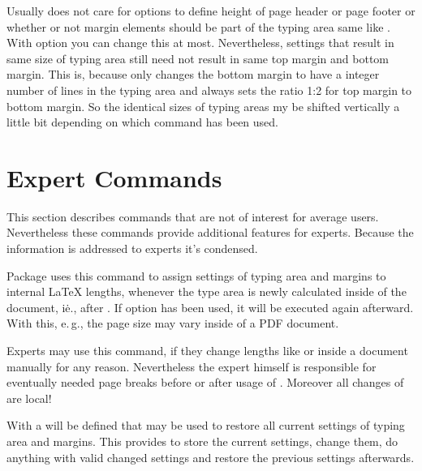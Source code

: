 \begin{Declaration}
\end{Declaration}
Usually  does not care for options to define
height of page header or page footer or whether or not margin elements should
be part of the typing area same like . With
option  you can change this at most. Nevertheless,
settings that result in same size of typing area still need not result in same
top margin and bottom margin. This is, because 
only changes the bottom margin to have a integer number of lines in the typing
area and  always sets the ratio 1:2 for top
margin to bottom margin. So the identical sizes of typing areas my be shifted
vertically a little bit depending on which command has been used.%
\EndIndexGroup


\section{Expert Commands}

This section describes commands that are not of interest for average
users. Nevertheless these commands provide additional features for
experts. Because the information is addressed to experts it's condensed.

\begin{Declaration}
\end{Declaration}%
Package  uses this command to assign settings of typing area
and margins to internal \LaTeX{} lengths, whenever the type area is newly
calculated inside of the document, i\.e., after
. If option
 has been used, it will be executed again
afterward. With this, e.\,g., the page size may vary inside of a PDF document.

Experts may use this command, if they change lengths like 
or  inside a document manually for any reason. Nevertheless
the expert himself is responsible for eventually needed page breaks before or
after usage of . Moreover all changes of
 are local!%
% 
\EndIndexGroup


\begin{Declaration}
\end{Declaration}
With  a  will be defined that may be
used to restore all current settings of typing area and margins. This provides
to store the current settings, change them, do anything with valid changed
settings and restore the previous settings afterwards.

